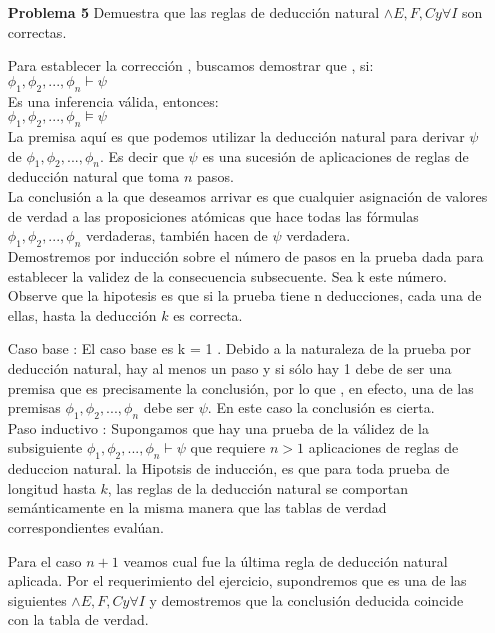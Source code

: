 \documentclass{article}
\begin{document}
\begin{enumerate}
\begin{itemize}
\end{itemize} 
 

\item[\bf{Problema 5}] Demuestra que las reglas de deducción natural $\wedge E, F, C y \forall I$ son correctas.

Para establecer la corrección , buscamos demostrar que , si:\\
$\phi_1,\phi_2,...,\phi_n \vdash \psi$\\ 
Es una inferencia válida, entonces:\\
$\phi_1,\phi_2,...,\phi_n \models \psi$\\ 

La premisa aquí es que podemos utilizar la deducción natural para derivar $\psi$ de $\phi_1,\phi_2,...,\phi_n$. Es decir que $\psi$ es una sucesión de aplicaciones de reglas de deducción natural que toma $n$ pasos.\\
La conclusión a la que deseamos arrivar es que cualquier asignación de valores de verdad a las proposiciones atómicas que hace todas las fórmulas $\phi_1,\phi_2,...,\phi_n$ verdaderas, también hacen de $\psi$ verdadera.\\

Demostremos por inducción sobre el número de pasos en la prueba dada para establecer la validez de la consecuencia subsecuente. Sea k este número. 
Observe que la hipotesis es que si la prueba tiene n deducciones, cada una de ellas, hasta la deducción $k$ es correcta.

Caso base : El caso base es k = 1 . Debido a la naturaleza de la prueba por deducción natural, hay al menos un paso y si sólo hay 1 debe de ser una premisa que es precisamente la conclusión, por lo que , en efecto, una de las premisas $\phi_1,\phi_2,...,\phi_n$ debe ser $\psi$. En este caso la conclusión es cierta.\\

Paso inductivo : Supongamos que hay una prueba de la válidez de la subsiguiente
$\phi_1,\phi_2,...,\phi_n \vdash \psi$ 
que requiere $n > 1$ aplicaciones de reglas de deduccion natural.
la Hipotsis de inducción, es que para toda prueba de longitud hasta $k$, las reglas de la deducción natural se comportan semánticamente en la misma manera que las tablas de verdad correspondientes evalúan.

Para el caso $n+1$ veamos cual fue la última regla de deducción natural aplicada.
Por el requerimiento del ejercicio, supondremos que es una de las siguientes $\wedge E, F, C y \forall I$
y demostremos que la conclusión deducida coincide con la tabla de verdad.


\end{enumerate}
\end{document}
